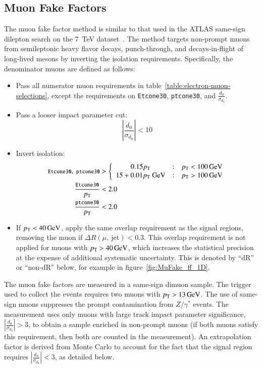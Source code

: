 \subsection{Muon Fake Factors}\label{sec:muon-fake-factors}
The muon fake factor method is similar to that used in the ATLAS same-sign dilepton search on the \SI{7}{\tera\electronvolt} dataset~\cite{TheATLASCollaboration:2012df}. The method targets non-prompt muons from semileptonic heavy flavor decays, punch-through, and decays-in-flight of long-lived mesons by inverting the isolation requirements. Specifically, the denominator muons are defined as follows:
\begin{itemize}
  \item Pass all numerator muon requirements in table~\ref{table:electron-muon-selections}, except the requirements on \verb.Etcone30., \verb.ptcone30., and $\frac{d_0}{\sigma_{d_0}}$. 
  \item Pass a looser impact parameter cut:
  \begin{equation}
	|\frac{d_0}{\sigma_{d_0}}|<10
  \end{equation}
  \item Invert isolation:
  \begin{align}
	{\footnotesize \texttt{Etcone30}},\ {\footnotesize \texttt{ptcone30}} &> \left\{\begin{array}{ccc} 0.15 p_{\text{T}} & : & p_{\text{T}}<\SI{100}{\giga\electronvolt} \\ 15+0.01 p_{\text{T}}~\mbox{GeV} & : & p_{\text{T}}>\SI{100}{\giga\electronvolt} \end{array} \right. \\
	{\footnotesize \frac{\texttt{Etcone30}}{p_{\text{T}}}} &< 2.0 \\
	{\footnotesize \frac{\texttt{ptcone30}}{p_{\text{T}}}} &< 2.0 \\
  \end{align}
  \item If $p_{\text{T}}<\SI{40}{\giga\electronvolt}$, apply the same overlap requirement as the signal regions, removing the muon if $\Delta R (\mu,\ \mbox{jet})<0.3$. This overlap requirement is not applied for muons with $p_{\text{T}}>\SI{40}{\giga\electronvolt}$, which increases the statistical precision at the expense of additional systematic uncertainty. This is denoted by ``dR'' or ``non-dR'' below, for example in figure~\ref{fig:MuFake_ff_1D}.
\end{itemize}

The muon fake factors are measured in a same-sign dimuon sample. The trigger used to collect the events requires two muons with $p_{\text{T}}>\SI{13}{\giga\electronvolt}$. The use of same-sign muons suppresses the prompt contamination from $Z/\gamma^{*}$ events. The measurement uses only muons with large track impact parameter significance, $|\frac{d_0}{\sigma_{d_0}}|>3$, to obtain a sample enriched in non-prompt muons (if both muons satisfy this requirement, then both are counted in the measurement). An extrapolation factor is derived from Monte Carlo to account for the fact that the signal region requires $|\frac{d_0}{\sigma_{d_0}}|<3$, as detailed below.

